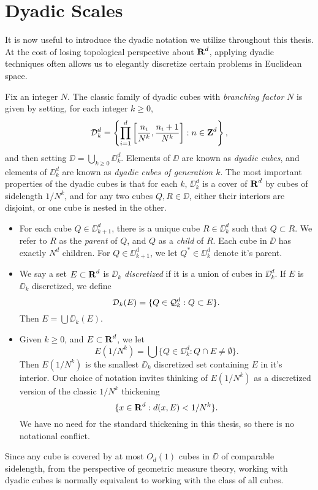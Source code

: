 \section{Dyadic Scales}

It is now useful to introduce the dyadic notation we utilize throughout this thesis. At the cost of losing topological perspective about $\operatorname{\mathbf{R}}^d$, applying dyadic techniques often allows us to elegantly discretize certain problems in Euclidean space.

Fix an integer $N$. The classic family of dyadic cubes with \emph{branching factor} $N$ is given by setting, for each integer $k \geq 0$,
%
\[ \operatorname{\mathcal{D}}_k^d = \left\{ \prod_{i = 1}^d \left[ \frac{n_i}{N^k}, \frac{n_i + 1}{N^k} \right] : n \in \operatorname{\mathbf{Z}}^d \right\}, \]
%
and then setting $\DD = \bigcup_{k \geq 0} \DD_k^d$. Elements of $\DD$ are known as \emph{dyadic cubes}, and elements of $\DD_k^d$ are known as \emph{dyadic cubes of generation $k$}. The most important properties of the dyadic cubes is that for each $k$, $\DD_k^d$ is a cover of $\operatorname{\mathbf{R}}^d$ by cubes of sidelength $1/N^k$, and for any two cubes $Q,R \in \DD$, either their interiors are disjoint, or one cube is nested in the other.
%
\begin{itemize}
	\item For each cube $Q \in \DD_{k+1}^d$, there is a unique cube $R \in \DD_k^d$ such that $Q \subset R$. We refer to $R$ as the \emph{parent} of $Q$, and $Q$ as a \emph{child} of $R$. Each cube in $\DD$ has exactly $N^d$ children. For $Q \in \DD_{k+1}^d$, we let $Q^* \in \DD_k^d$ denote it's parent.

	\item We say a set $E \subset \operatorname{\mathbf{R}}^d$ is \emph{$\DD_k$ discretized} if it is a union of cubes in $\DD_k^d$. If $E$ is $\DD_k$ discretized, we define
	\[ \operatorname{\mathcal{D}}_k(E) = \{ Q \in \operatorname{\mathcal{Q}}_k^d : Q \subset E \}. \]
	Then $E = \bigcup \DD_k(E)$.

	\item Given $k \geq 0$, and $E \subset \operatorname{\mathbf{R}}^d$, we let
	\[ E(1/N^k) = \bigcup \{ Q \in \DD_k^d : Q \cap E \neq \emptyset \}. \]
	Then $E(1/N^k)$ is the smallest $\DD_k$ discretized set containing $E$ in it's interior. Our choice of notation invites thinking of $E(1/N^k)$ as a discretized version of the classic $1/N^k$ thickening
	\[ \{ x \in \operatorname{\mathbf{R}}^d : d(x,E) < 1/N^k \}. \]
	We have no need for the standard thickening in this thesis, so there is no notational conflict.
\end{itemize}
%
Since any cube is covered by at most $O_d(1)$ cubes in $\DD$ of comparable sidelength, from the perspective of geometric measure theory, working with dyadic cubes is normally equivalent to working with the class of all cubes.


